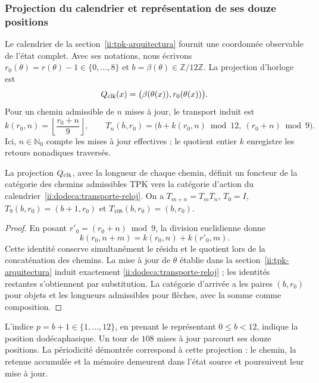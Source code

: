 \subsubsection{Projection du calendrier et représentation de ses douze positions}
\label{ii:dodeca:calendario}
Le calendrier de la section~\ref{ii:tpk-arquitectura} fournit une
coordonnée observable de l’état complet. Avec ses notations, nous écrivons
\(r_0(\theta)=r(\theta)-1\in\{0,\ldots,8\}\) et
\(b=\beta(\theta)\in\mathbb Z/12\mathbb Z\). La projection d’horloge est
\[
 Q_{\rm clk}(x)=\bigl(\beta(\theta(x)),r_0(\theta(x))\bigr).
\]
Pour un chemin admissible de \(n\) mises à jour, le transport induit est
\begin{equation}
 k(r_0,n)=\left\lfloor\frac{r_0+n}{9}\right\rfloor,
 \qquad
 T_n(b,r_0)=\bigl(b+k(r_0,n)\bmod12,\ (r_0+n)\bmod9\bigr).
 \label{ii:dodeca:transporte-reloj}
\end{equation}
Ici, \(n\in\mathbb N_0\) compte les mises à jour effectives ; le quotient
entier \(k\) enregistre les retours nonadiques traversés.

\begin{proposition}
\label{ii:dodeca:composicion}
La projection \(Q_{\rm clk}\), avec la longueur de chaque chemin, définit
un foncteur de la catégorie des chemins admissibles TPK vers la catégorie d’action
du calendrier~\eqref{ii:dodeca:transporte-reloj}. On a
\(T_{m+n}=T_mT_n\), \(T_0=I\),
\(T_9(b,r_0)=(b+1,r_0)\) et \(T_{108}(b,r_0)=(b,r_0)\).
\end{proposition}
\begin{proof}
En posant \(r'_0=(r_0+n)\bmod9\), la division euclidienne donne
\[
 k(r_0,n+m)=k(r_0,n)+k(r'_0,m).
\]
Cette identité conserve simultanément le résidu et le quotient lors de la concaténation
des chemins. La mise à jour de \(\theta\) établie dans la
section~\ref{ii:tpk-arquitectura} induit exactement
\eqref{ii:dodeca:transporte-reloj} ; les identités restantes s’obtiennent
par substitution. La catégorie d’arrivée a les paires \((b,r_0)\) pour
objets et les longueurs admissibles pour flèches, avec la somme comme composition.
\end{proof}

L’indice \(p=b+1\in\{1,\ldots,12\}\), en prenant le représentant
\(0\le b<12\), indique la position dodécaphasique. Un tour de
\(108\) mises à jour parcourt ses douze positions. La périodicité
démontrée correspond à cette projection : le chemin, la retenue accumulée et la
mémoire demeurent dans l’état source et poursuivent leur mise à jour.


